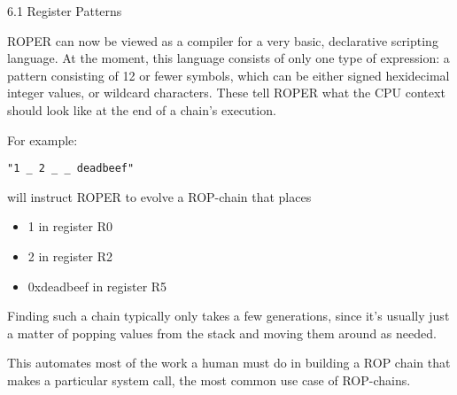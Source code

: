 \documentclass[9pt]{beamer}
\begin{document}
\begin{frame}[fragile]{6.1 Register Patterns}

ROPER can now be viewed as a compiler for a very basic, declarative scripting language. At the moment, this language consists of only one type of expression: a pattern consisting of 12 or fewer symbols, which can be either signed hexidecimal integer values, or wildcard characters. These tell ROPER what the CPU context should look like at the end of a chain's execution. 

\vspace{.25cm}

For example:

\begin{verbatim}
"1 _ 2 _ _ deadbeef"
\end{verbatim}

will instruct ROPER to evolve a ROP-chain that places
\begin{itemize}
    \item 1 in register R0
    \item 2 in register R2
    \item 0xdeadbeef in register R5
\end{itemize}

\vspace{.2cm}

Finding such a chain typically only takes a few generations, since it's usually just a matter of popping values from the stack and moving them around as needed.

\vspace{.2cm}

This automates most of the work a human must do in building a ROP chain that makes a particular system call, the most common use case of ROP-chains.

\end{frame}
\end{document}
